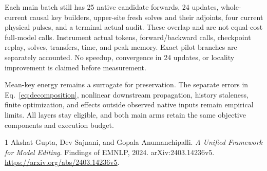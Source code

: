 \documentclass[10pt]{article}
\begin{document}
Each main batch still has 25 native candidate forwards, 24 updates,
whole-current causal key builders, upper-site fresh solves and their
adjoints, four current physical pulses, and a terminal actual audit.
These overlap and are not equal-cost full-model calls. Instrument actual
tokens, forward/backward calls, checkpoint replay, solves, transfers,
time, and peak memory. Exact pilot branches are separately accounted.
No speedup, convergence in 24 updates, or locality improvement is claimed
before measurement.

Mean-key energy remains a surrogate for preservation. The separate
errors in Eq.~\eqref{eq:decomposition}, nonlinear downstream propagation,
history staleness, finite optimization, and effects outside observed
native inputs remain empirical limits. All layers stay eligible, and
both main arms retain the same objective components and execution budget.

\begin{thebibliography}{1}
Akshat Gupta, Dev Sajnani, and Gopala Anumanchipalli.
\emph{A Unified Framework for Model Editing}.
Findings of EMNLP, 2024. arXiv:2403.14236v5.
\url{https://arxiv.org/abs/2403.14236v5}.
\end{thebibliography}
\end{document}
